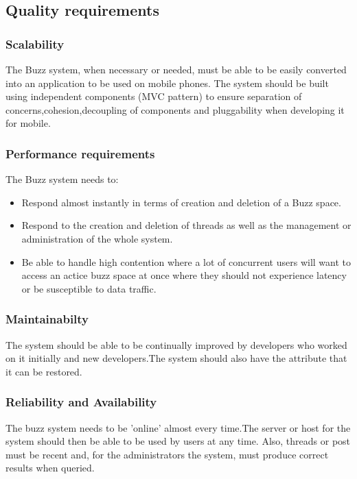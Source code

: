 \documentclass[10pt]{article}
\begin{document}
\subsection{Quality requirements} %
\subsubsection{Scalability}

The  Buzz system, when necessary or needed,  must be able to be easily converted into an application to be used on mobile phones. The system should be built using independent components (MVC pattern)  to ensure separation of concerns,cohesion,decoupling of components and pluggability when developing it for mobile.

\subsubsection{Performance requirements}
The Buzz system needs to:
\begin{itemize}
\item Respond almost instantly in terms of creation and deletion of a Buzz space.
\item Respond to the creation and deletion of threads as well as the management or administration of the whole system.
\item Be able to handle high contention where a lot of concurrent users will want to access an actice buzz space at once where they should not experience latency or be susceptible to data traffic.
\end{itemize}
\subsubsection{Maintainabilty}

The system should be able to be continually improved by developers who worked on it initially and new developers.The system should also have the attribute that it can be restored.

\subsubsection{Reliability and Availability}

The buzz system needs to be 'online' almost every time.The server or host for the system should then be able to be used by users at any time. Also, threads or post must be recent and, for the administrators the system, must produce correct results when queried.
\end{document}
